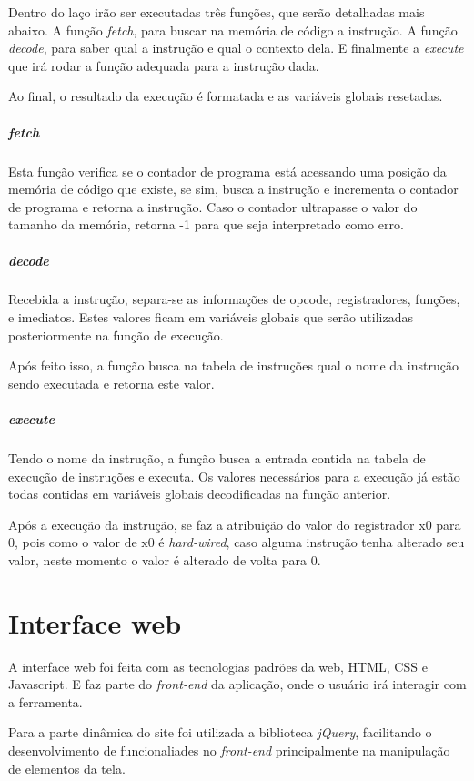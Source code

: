 					Dentro do laço irão ser executadas três funções, que serão detalhadas mais abaixo. A função \textit{fetch}, para buscar na memória de código a instrução. A função \textit{decode}, para saber qual a instrução e qual o contexto dela. E finalmente a \textit{execute} que irá rodar a função adequada para a instrução dada.

					Ao final, o resultado da execução é formatada e as variáveis globais resetadas.

				\subparagraph{fetch}
				
					Esta função verifica se o contador de programa está acessando uma posição da memória de código que existe, se sim, busca a instrução e incrementa o contador de programa e retorna a instrução. Caso o contador ultrapasse o valor do tamanho da memória, retorna -1 para que seja interpretado como erro.

				\subparagraph{decode}
					
					Recebida a instrução, separa-se as informações de opcode, registradores, funções, e imediatos. Estes valores ficam em variáveis globais que serão utilizadas posteriormente na função de execução.

					Após feito isso, a função busca na tabela de instruções qual o nome da instrução sendo executada e retorna este valor.


				\subparagraph{execute}
			
					Tendo o nome da instrução, a função busca a entrada contida na tabela de execução de instruções e executa. Os valores necessários para a execução já estão todas contidas em variáveis globais decodificadas na função anterior.

					Após a execução da instrução, se faz a atribuição do valor do registrador x0 para 0, pois como o valor de x0 é \textit{hard-wired}, caso alguma instrução tenha alterado seu valor, neste momento o valor é alterado de volta para 0.



\section{Interface web}

	A interface web foi feita com as tecnologias padrões da web, HTML, CSS e Javascript. E faz parte do \textit{front-end} da aplicação, onde o usuário irá interagir com a ferramenta. 

	Para a parte dinâmica do site foi utilizada a biblioteca \textit{jQuery}, facilitando o desenvolvimento de funcionaliades no \textit{front-end} principalmente na manipulação de elementos da tela. 

